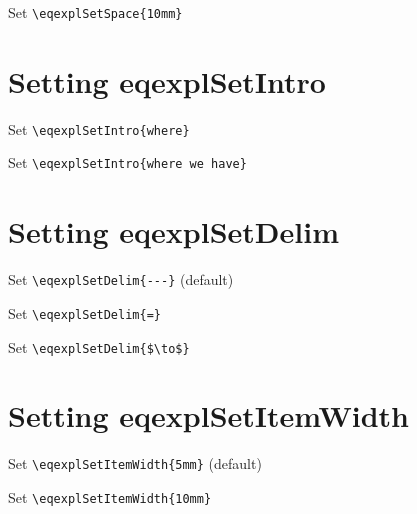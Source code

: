 \documentclass{article}
\begin{document}
Set \verb+\eqexplSetSpace{10mm}+
\eqexplSetSpace{10mm}
\begin{eqexpl}
  \testList
\end{eqexpl}

\eqexplSetSpace{}

\section{Setting eqexplSetIntro}

Set \verb+\eqexplSetIntro{where}+
\begin{eqexpl}
  \testList
\end{eqexpl}

Set \verb+\eqexplSetIntro{where we have}+
\begin{eqexpl}
  \testList
\end{eqexpl}

\eqexplSetIntro{}

\section{Setting eqexplSetDelim}

Set \verb+\eqexplSetDelim{---}+ (default)
\eqexplSetDelim{---}
\begin{eqexpl}
  \testList
\end{eqexpl}

Set \verb+\eqexplSetDelim{=}+
\eqexplSetDelim{=}
\begin{eqexpl}
  \testList
\end{eqexpl}

Set \verb+\eqexplSetDelim{$\to$}+
\eqexplSetDelim{$\to$}
\begin{eqexpl}
  \testList
\end{eqexpl}

\eqexplSetDelim{---}

\section{Setting eqexplSetItemWidth}

Set \verb+\eqexplSetItemWidth{5mm}+ (default)
\eqexplSetItemWidth{5mm}
\begin{eqexpl}
  \testList
\end{eqexpl}

Set \verb+\eqexplSetItemWidth{10mm}+
\eqexplSetItemWidth{10mm}
\begin{eqexpl}
  \testList
\end{eqexpl}
\end{document}
